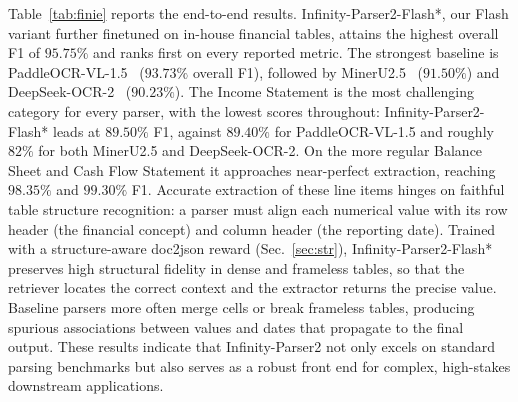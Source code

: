 Table~\ref{tab:finie} reports the end-to-end results. Infinity-Parser2-Flash*, our Flash variant further finetuned on in-house financial tables, attains the highest overall F1 of $95.75\%$ and ranks first on every reported metric. The strongest baseline is PaddleOCR-VL-1.5~\cite{cui2025paddleocr} ($93.73\%$ overall F1), followed by MinerU2.5~\cite{niu2025mineru2} ($91.50\%$) and DeepSeek-OCR-2~\cite{wei2026deepseek2} ($90.23\%$). The Income Statement is the most challenging category for every parser, with the lowest scores throughout: Infinity-Parser2-Flash* leads at $89.50\%$ F1, against $89.40\%$ for PaddleOCR-VL-1.5 and roughly $82\%$ for both MinerU2.5 and DeepSeek-OCR-2. On the more regular Balance Sheet and Cash Flow Statement it approaches near-perfect extraction, reaching $98.35\%$ and $99.30\%$ F1. Accurate extraction of these line items hinges on faithful table structure recognition: a parser must align each numerical value with its row header (the financial concept) and column header (the reporting date). Trained with a structure-aware doc2json reward (Sec.~\ref{sec:str}), Infinity-Parser2-Flash* preserves high structural fidelity in dense and frameless tables, so that the retriever locates the correct context and the extractor returns the precise value. Baseline parsers more often merge cells or break frameless tables, producing spurious associations between values and dates that propagate to the final output. These results indicate that Infinity-Parser2 not only excels on standard parsing benchmarks but also serves as a robust front end for complex, high-stakes downstream applications.
